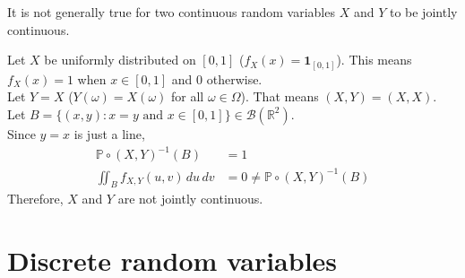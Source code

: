 \documentclass{huhtakm-template-book}
\newcommand{\prob}{\mathbb{P}}
\begin{document}
    \begin{rem}
        It is not generally true for two continuous random variables $X$ and $Y$ to be jointly continuous.
    \end{rem}
    \begin{eg}
        Let $X$ be uniformly distributed on $[0,1]$ ($f_{X}(x)=\mathbf{1}_{[0,1]}$). This means $f_{X}(x)=1$ when $x\in[0,1]$ and $0$ otherwise.\\
	    Let $Y=X$ ($Y(\omega)=X(\omega)$ for all $\omega\in\Omega$). That means $(X,Y)=(X,X)$. Let $B=\{(x,y):x=y\text{ and }x\in[0,1]\}\in\mathcal{B}(\mathbb{R}^{2})$.\\
	    Since $y=x$ is just a line,
        \begin{align*}
            \prob\circ(X,Y)^{-1}(B)&=1\\
            \iint_{B}f_{X,Y}(u,v)\,du\,dv&=0\neq\prob\circ(X,Y)^{-1}(B)
        \end{align*}
        Therefore, $X$ and $Y$ are not jointly continuous.
    \end{eg}
    
\chapter{Discrete random variables}
\end{document}
